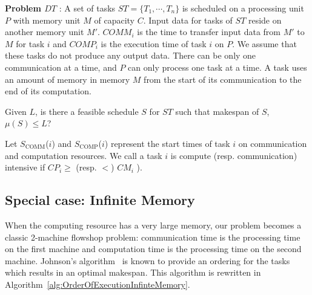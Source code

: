 \documentclass[sigconf]{acmart}
\newcommand{\scomm}{\ensuremath{{S}_{\text{COMM}}}}
\newcommand{\scomp}{\ensuremath{{S}_{\text{COMP}}}}
\begin{document}
	\noindent\textbf{Problem $DT$} : A set of tasks $ST=\{T_1,
	\cdots, T_n\}$ is scheduled on a processing unit $P$ with
	memory unit $M$ of capacity $C$. Input data for tasks of $ST$
	reside on another memory unit $M'$. $COMM_i$ is the time to
	transfer input data from $M'$ to $M$ for task $i$ and $COMP_i$
	is the execution time of task $i$ on $P$. We assume that these
	tasks do not produce any output data. There can be only one
	communication at a time, and $P$ can only process one task at
	a time. A task uses an amount of memory in memory $M$ from the
	start of its communication to the end of its computation.
	
	\noindent Given $L$, is there a feasible schedule $S$ for $ST$ such that
	makespan of $S$, $\mu(S) \le L$?
	
	
	Let \scomm($i$) and  \scomp($i$) represent the start times of task $i$ on communication and computation resources. We call a task $i$ is compute (resp. communication) intensive if $CP_i $$\ge$ (resp. $<$) $CM_i$ ).
	
	
	
	\subsection{Special case: Infinite Memory}
	
	When the computing resource has a very large memory, our problem
	becomes a classic 2-machine flowshop problem: communication time is
	the processing time on the first machine and computation time is the
	processing time on the second machine. Johnson's
	algorithm~\cite{johnson} is known to provide an ordering for the tasks
	which results in an optimal makespan. This algorithm is rewritten in
	Algorithm~\ref{alg:OrderOfExecutionInfinteMemory}.
	
\end{document}
